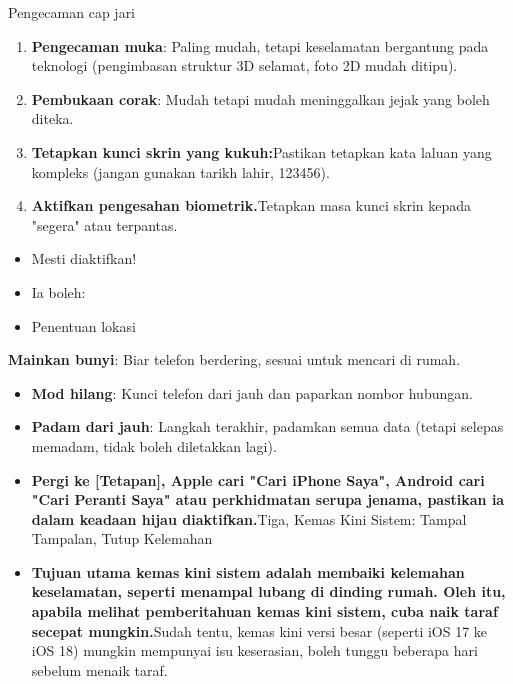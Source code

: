 


Pengecaman cap jari


\begin{enumerate}
  \item \textbf{Pengecaman muka}: Paling mudah, tetapi keselamatan bergantung pada teknologi (pengimbasan struktur 3D selamat, foto 2D mudah ditipu).
  \item \textbf{Pembukaan corak}: Mudah tetapi mudah meninggalkan jejak yang boleh diteka.
  \item \textbf{Tetapkan kunci skrin yang kukuh:}Pastikan tetapkan kata laluan yang kompleks (jangan gunakan tarikh lahir, 123456).
  \item \textbf{Aktifkan pengesahan biometrik.}Tetapkan masa kunci skrin kepada "segera" atau terpantas.
\end{enumerate}


\begin{itemize}
  \item Mesti diaktifkan!
  \item Ia boleh:
  \item Penentuan lokasi
\end{itemize}


\textbf{Mainkan bunyi}: Biar telefon berdering, sesuai untuk mencari di rumah.

\begin{itemize}
  \item \textbf{Mod hilang}: Kunci telefon dari jauh dan paparkan nombor hubungan.
  \item \textbf{Padam dari jauh}: Langkah terakhir, padamkan semua data (tetapi selepas memadam, tidak boleh diletakkan lagi).
  \item \textbf{Pergi ke [Tetapan], Apple cari "Cari iPhone Saya", Android cari "Cari Peranti Saya" atau perkhidmatan serupa jenama, pastikan ia dalam keadaan hijau diaktifkan.}Tiga, Kemas Kini Sistem: Tampal Tampalan, Tutup Kelemahan
  \item \textbf{Tujuan utama kemas kini sistem adalah membaiki kelemahan keselamatan, seperti menampal lubang di dinding rumah. Oleh itu, apabila melihat pemberitahuan kemas kini sistem, cuba naik taraf secepat mungkin.}Sudah tentu, kemas kini versi besar (seperti iOS 17 ke iOS 18) mungkin mempunyai isu keserasian, boleh tunggu beberapa hari sebelum menaik taraf.
\end{itemize}

